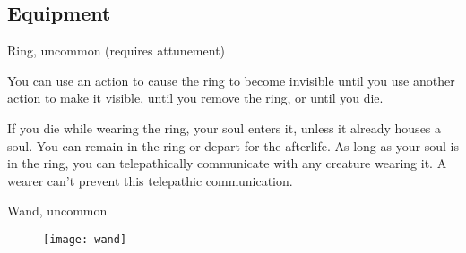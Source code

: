 \subsection{Equipment}

{Ring, uncommon (requires attunement)}

You can use an action to cause the ring to become invisible until you use another action to make it visible, until you remove the ring, or until you die.

If you die while wearing the ring, your soul enters it, unless it already houses a soul. You can remain in the ring or depart for the afterlife. As long as your soul is in the ring, you can telepathically communicate with any creature wearing it. A wearer can't prevent this telepathic communication.

{Wand, uncommon}

\begin{figure}[h]
	\texttt{[image: wand]}
\end{figure}
